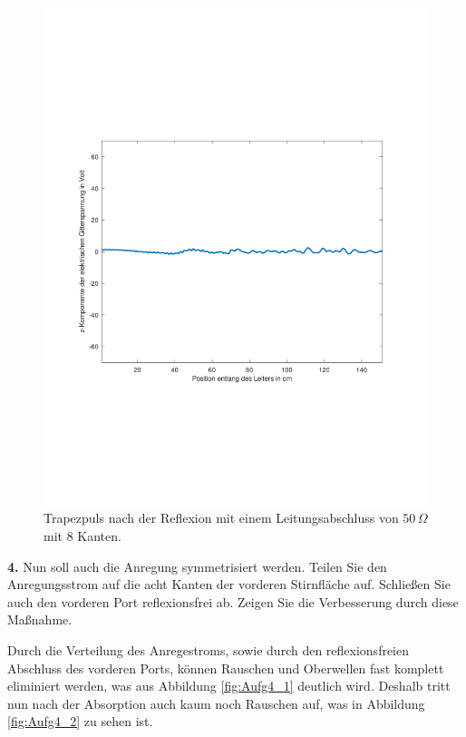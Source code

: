 \documentclass[Protokollheft.tex]{subfiles}
\begin{document}
\begin{figure}[ht]
	\centering
	\includegraphics[trim = 20mm 65mm 20mm 65mm, clip,width=0.7\linewidth]{Aufgabe3_2.pdf}
	\caption{Trapezpuls nach der Reflexion mit einem Leitungsabschluss von $50\,\Omega$ mit 8 Kanten.}\label{fig:Aufg3_2}
\end{figure}

\begin{framed}
	\noindent \textbf{4.} Nun soll auch die Anregung symmetrisiert werden. Teilen Sie
den Anregungsstrom auf die acht Kanten der vorderen Stirnfläche
auf. Schließen Sie auch den vorderen Port reflexionsfrei ab.
Zeigen Sie die Verbesserung durch diese Maßnahme.\label{exer:symmetrizeExcitation}
\end{framed}
\noindent
Durch die Verteilung des Anregestroms, sowie durch den reflexionsfreien Abschluss des vorderen Ports, können Rauschen und Oberwellen fast komplett eliminiert werden, was aus Abbildung \ref{fig:Aufg4_1} deutlich wird. Deshalb tritt nun nach der Absorption auch kaum noch Rauschen auf, was in Abbildung \ref{fig:Aufg4_2} zu sehen ist.
\end{document}
